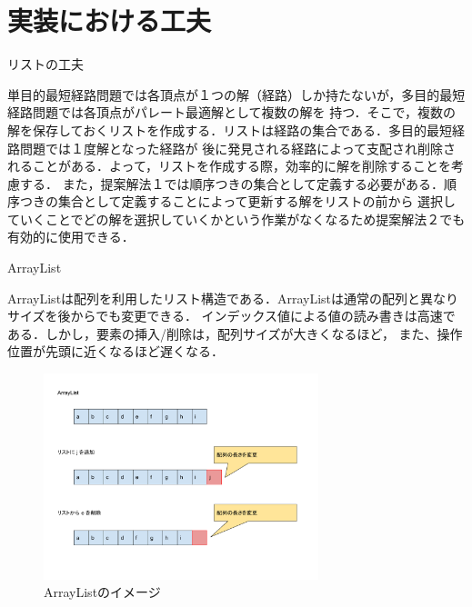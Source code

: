 \documentclass[12pt]{optlab-bachelor}
\begin{document}
\section{実装における工夫}

\begin{description}
  \item[リストの工夫]
\end{description}

単目的最短経路問題では各頂点が１つの解（経路）しか持たないが，多目的最短経路問題では各頂点がパレート最適解として複数の解を
持つ．そこで，複数の解を保存しておくリストを作成する．リストは経路の集合である．多目的最短経路問題では１度解となった経路が
後に発見される経路によって支配され削除されることがある．よって，リストを作成する際，効率的に解を削除することを考慮する．
また，提案解法１では順序つきの集合として定義する必要がある．順序つきの集合として定義することによって更新する解をリストの前から
選択していくことでどの解を選択していくかという作業がなくなるため提案解法２でも有効的に使用できる．

\begin{description}
  \item[ArrayList]
\end{description}

ArrayListは配列を利用したリスト構造である．ArrayListは通常の配列と異なりサイズを後からでも変更できる．
インデックス値による値の読み書きは高速である．しかし，要素の挿入/削除は，配列サイズが大きくなるほど，
また、操作位置が先頭に近くなるほど遅くなる．

\begin{figure}[htbp]
  \centering
  \caption{ArrayListのイメージ}
  \includegraphics[height=6.0cm, width=8.0cm]{fig/fig9.pdf}
\end{figure}
\end{document}
